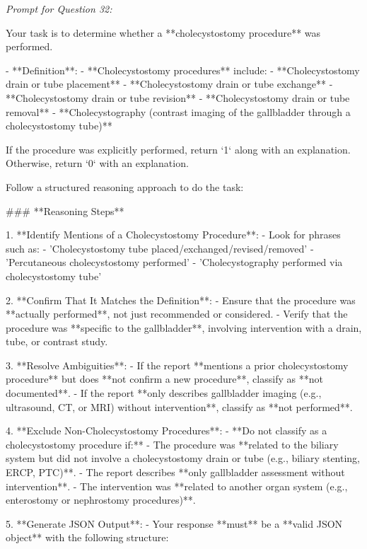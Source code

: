 \textit{\normalsize Prompt for Question  32:}
\begin{mdframed}[]
\normalsize

Your task is to determine whether a **cholecystostomy procedure** was performed.  

- **Definition**:  
  - **Cholecystostomy procedures** include:  
    - **Cholecystostomy drain or tube placement**  
    - **Cholecystostomy drain or tube exchange**  
    - **Cholecystostomy drain or tube revision**  
    - **Cholecystostomy drain or tube removal**  
    - **Cholecystography (contrast imaging of the gallbladder through a cholecystostomy tube)**  

If the procedure was explicitly performed, return `1` along with an explanation. Otherwise, return `0` with an explanation.

Follow a structured reasoning approach to do the task:


### **Reasoning Steps**  

1. **Identify Mentions of a Cholecystostomy Procedure**:  
   - Look for phrases such as:  
     - 'Cholecystostomy tube placed/exchanged/revised/removed'  
     - 'Percutaneous cholecystostomy performed'  
     - 'Cholecystography performed via cholecystostomy tube'  

2. **Confirm That It Matches the Definition**:  
   - Ensure that the procedure was **actually performed**, not just recommended or considered.  
   - Verify that the procedure was **specific to the gallbladder**, involving intervention with a drain, tube, or contrast study.  

3. **Resolve Ambiguities**:  
   - If the report **mentions a prior cholecystostomy procedure** but does **not confirm a new procedure**, classify as **not documented**.  
   - If the report **only describes gallbladder imaging (e.g., ultrasound, CT, or MRI) without intervention**, classify as **not performed**.  

4. **Exclude Non-Cholecystostomy Procedures**:  
   - **Do not classify as a cholecystostomy procedure if:**  
     - The procedure was **related to the biliary system but did not involve a cholecystostomy drain or tube (e.g., biliary stenting, ERCP, PTC)**.  
     - The report describes **only gallbladder assessment without intervention**.  
     - The intervention was **related to another organ system (e.g., enterostomy or nephrostomy procedures)**.  

5. **Generate JSON Output**:  
   - Your response **must** be a **valid JSON object** with the following structure:  

\end{mdframed}

